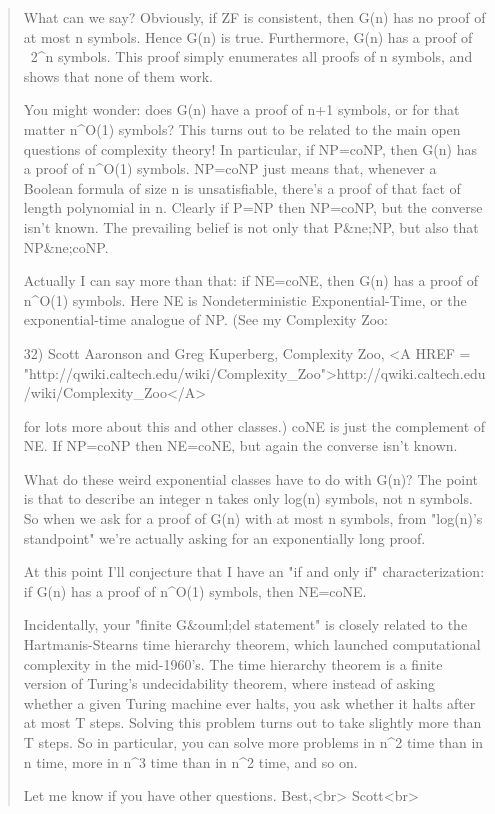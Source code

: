 \begin{quote}
  What can we say?  Obviously, if ZF is consistent, then G(n) has no 
  proof of at most n symbols.  Hence G(n) is true.  Furthermore, G(n) 
  has a proof of ~2^{n} symbols.  This proof simply enumerates all 
  proofs of \le n symbols, and shows that none of them work.

  You might wonder: does G(n) have a proof of n+1 symbols, or for that 
  matter n^{O(1)} symbols?  
  This turns out to be related to the main open 
  questions of complexity theory!  In particular, if NP=coNP, then G(n) 
  has a proof of n^{O(1)} symbols.  NP=coNP just means that, whenever a 
  Boolean formula of size n is unsatisfiable, there's a proof of that 
  fact of length polynomial in n.  Clearly if P=NP then NP=coNP, but the 
  converse isn't known.  The prevailing belief is not only that P&ne;NP, 
  but also that NP&ne;coNP.

  Actually I can say more than that: if NE=coNE, then G(n) has a proof 
  of n^{O(1)} symbols.  Here NE is Nondeterministic Exponential-Time, 
  or the exponential-time analogue of NP.  (See my Complexity Zoo:

32) Scott Aaronson and Greg Kuperberg, Complexity Zoo,
 <A HREF = "http://qwiki.caltech.edu/wiki/Complexity_Zoo">http://qwiki.caltech.edu/wiki/Complexity_Zoo</A>

  for lots more about this and other classes.)  coNE is just the 
  complement of NE.  If NP=coNP then NE=coNE, but again the converse 
  isn't known.

  What do these weird exponential classes have to do with G(n)?  The 
  point is that to describe an integer n takes only log(n) symbols, 
  not n symbols.  So when we ask for a proof of G(n) with at most n 
  symbols, from "log(n)'s standpoint" we're actually asking for an 
  exponentially long proof.

  At this point I'll conjecture that I have an "if and only if" 
  characterization: if G(n) has a proof of n^{O(1)} 
  symbols, then NE=coNE.
 
  Incidentally, your "finite G&ouml;del statement" is closely related to the 
  Hartmanis-Stearns time hierarchy theorem, which launched computational 
  complexity in the mid-1960's.  The time hierarchy theorem is a finite 
  version of Turing's undecidability theorem, where instead of asking 
  whether a given Turing machine ever halts, you ask whether it halts 
  after at most T steps.  Solving this problem turns out to take slightly 
  more than T steps.  So in particular, you can solve more problems in 
  n^{2} time than in n time, more in 
  n^{3} time than in n^{2} time, and so on.
 
  Let me know if you have other questions.
  Best,<br>
  Scott<br>
\end{quote}


